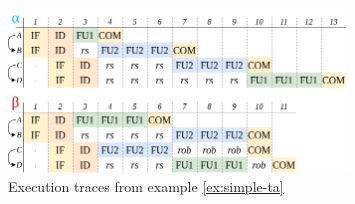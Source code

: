 \begin{figure}[htbp]
    \centering
    \includegraphics[width=0.8\textwidth]{figures/multiscalar_ta.png}
    \caption{Execution traces from example \ref{ex:simple-ta}}
    \label{fig:multiscalar-ta}
\end{figure}





